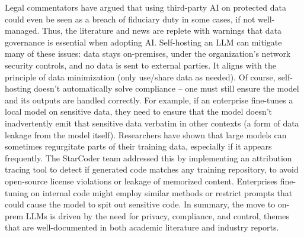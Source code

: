 Legal commentators \autocite{Smith2023} have argued that using third-party AI on protected data could even be seen as a breach of fiduciary duty in some cases, if not well-managed. Thus, the literature and news are replete with warnings that data governance is essential when adopting AI. Self-hosting an LLM can mitigate many of these issues: data stays on-premises, under the organization’s network security controls, and no data is sent to external parties. It aligns with the principle of data minimization (only use/share data as needed).
Of course, self-hosting doesn’t automatically solve compliance – one must still ensure the model and its outputs are handled correctly. For example, if an enterprise fine-tunes a local model on sensitive data, they need to ensure that the model doesn’t inadvertently emit that sensitive data verbatim in other contexts (a form of data leakage from the model itself). Researchers have shown that large models can sometimes regurgitate parts of their training data, especially if it appears frequently. The StarCoder team addressed this by implementing an attribution tracing tool to detect if generated code matches any training repository, to avoid open-source license violations or leakage of memorized content​. Enterprises fine-tuning on internal code might employ similar methods or restrict prompts that could cause the model to spit out sensitive code. In summary, the move to on-prem LLMs is driven by the need for privacy, compliance, and control, themes that are well-documented in both academic literature and industry reports.

